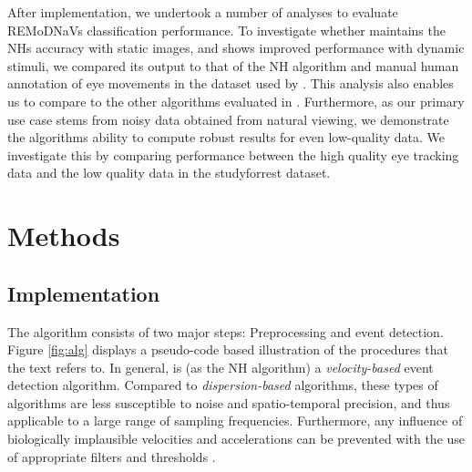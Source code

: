     After implementation, we undertook a number of analyses to evaluate REMoDNaVs classification performance. To
    investigate whether \remodnav maintains the NHs accuracy with static images, and shows improved performance with
    dynamic stimuli, we compared its output to that of the NH algorithm and manual human annotation of eye movements
    in the dataset used by \cite{Andersson2017}. This analysis also enables us to compare \remodnav to the other
    algorithms evaluated in \citet{Andersson2017}. Furthermore, as our primary use case stems from noisy data obtained
    from natural viewing, we demonstrate the algorithms ability to compute robust results for even low-quality data.
    We investigate this by comparing performance between the high quality eye tracking data and the low quality data
    in the studyforrest dataset.




    \section*{Methods}\label{methods}


    \subsection*{\remodnav Implementation}\label{impl}


    The algorithm consists of two major steps: Preprocessing and event detection. Figure \ref{fig:alg} displays a
    pseudo-code based illustration of the procedures that the text refers to. In general, \remodnav is (as the
    NH algorithm) a \textit{velocity-based} event detection algorithm. Compared to \textit{dispersion-based}
    algorithms, these types of algorithms are less susceptible to noise and spatio-temporal precision, and thus
    applicable to a large range of sampling frequencies. Furthermore, any influence of biologically implausible
    velocities and accelerations can be prevented with the use of appropriate filters and thresholds
    \citep{holmqvist2011eye}.

